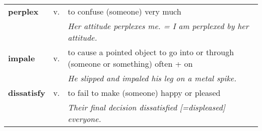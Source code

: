 \documentclass[a4paper]{article}
\begin{document}
\begin{longtable}{llp{11cm}}
\textbf{perplex} & v. &  to confuse (someone) very much \\
 & & \textit{Her attitude perplexes me. = I am perplexed by her attitude.}\\[0.08cm]
\textbf{impale} & v. &  to cause a pointed object to go into or through (someone or something) often + on \\
 & & \textit{He slipped and impaled his leg on a metal spike.}\\[0.08cm]
\textbf{dissatisfy} & v. &  to fail to make (someone) happy or pleased \\
 & & \textit{Their final decision dissatisfied [=displeased] everyone.}\\[0.08cm]
\end{longtable}
\end{document}
